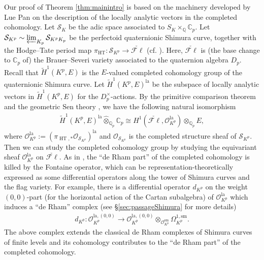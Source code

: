 \documentclass{article}
\theoremstyle{definition}
\def\calO{\mathcal{O}}
\def\calS{\mathcal{S}}
\def\bbC{\mathbb{C}}
\def\bbQ{\mathbb{Q}}
\DeclareMathOperator{\ox}{\otimes}
\def\isom{\cong}
\newcommand{\ilim}{\varprojlim}
\DeclareMathOperator{\HT}{HT}
\def\lan{\mathrm{la}}
\def\sm{\mathrm{sm}}
\def\tilde{\widetilde}
\def\fl{\mathscr{F}\ell}
\begin{document}
Our proof of Theorem \ref{thm:mainintro} is based on the machinery developed by Lue Pan \cite{Pan22,PanII} on the description of the locally analytic vectors in the completed cohomology. Let $\calS_{K}$ be the adic space associated to $S_{K}\times_{\bbQ}\bbC_p$. Let $\calS_{K^p}\sim\ilim_{K_p}\calS_{K^pK_p}$ be the perfectoid quaternionic Shimura curve, together with the Hodge--Tate period map $\pi_{\HT}:\calS_{K^p}\to \check{\fl}$ (cf. \cite{Sch15}). Here, $\check{\fl}$ is (the base change to $\bbC_p$ of) the Brauer--Severi variety associated to the quaternion algebra $D_p$. Recall that $\tilde{H}^1(K^p,E)$ is the $E$-valued completed cohomology group of the quaternionic Shimura curve. Let $\tilde{H}^1(K^p,E)^{\lan}$ be the subspace of locally analytic vectors in $\tilde{H}^1(K^p,E)$ for the $D_p^{\times}$-actions. By the primitive comparison theorem \cite{scholze_p-adic_2013} and the geometric Sen theory \cite{Pan22,camargo2022geometric}, we have the following natural isomorphism  
\begin{align*}
    \tilde{H}^1(K^p,E)^{\lan}\widehat{\ox}_{\bbQ_p}\bbC_p\isom H^1(\check{\fl},\calO_{K^p}^{\lan})\ox_{\bbQ_p}E,
\end{align*}
where $\calO_{K^p}^{\lan}:=(\pi_{\HT,*}\calO_{\calS_{K^p}})^{\lan}$ and $\calO_{\calS_{K^p}}$ is the completed structure sheaf of $\calS_{K^p}$. Then we can study the completed cohomology group by studying the equivariant sheaf $\calO_{K^p}^{\lan}$ on $\check{\fl}$. As in \cite{PanII}, the ``de Rham part'' of the completed cohomology is killed by the Fontaine operator, which can be representation-theoretically expressed as some differential operators along the tower of Shimura curves and the flag variety. For example, there is a differential operator $d_{K^p}$ on the weight $(0,0)$-part (for the horizontal action of the Cartan subalgebra) of $\calO_{K^p}^{\lan}$ which induces a ``de Rham'' complex (see \S\ref{sec:passageShimura} for more details)
\begin{align*}
   d_{K^p}:\calO_{K^p}^{\lan,(0,0)}\stackrel{}{\rightarrow} \calO_{K^p}^{\lan,(0,0)}\otimes_{\calO_{K^p}^{\sm}}\Omega^{1,\sm}_{K^p}.
\end{align*}    
The above complex extends the classical de Rham complexes of Shimura curves of finite levels and its cohomology contributes to the ``de Rham part'' of the completed cohomology. 
\end{document}
